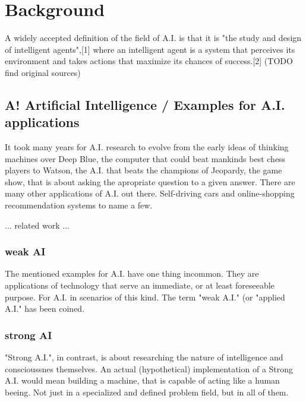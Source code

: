 \chapter{Background}

A widely accepted definition of the field of A.I. is that it is "the study and design of intelligent agents",[1] where an intelligent agent is a system that perceives its environment and takes actions that maximize its chances of success.[2] (TODO find original sources)

\section{A! Artificial Intelligence / Examples for A.I. applications}
It took many years for A.I. research to evolve from the early ideas of thinking machines over Deep Blue, the computer that could beat mankinds best chess players to Watson, the A.I. that beats the champions of Jeopardy, the game show, that is about asking the apropriate question to a given answer. There are many other applications of A.I. out there. Self-driving cars and online-shopping recommendation systems to name a few.

... related work ...

\subsection{weak AI}
The mentioned examples for A.I. have one thing incommon. They are applications of technology that serve an immediate, or at least foreseeable purpose. For A.I. in scenarios of this kind. The term "weak A.I." (or "applied A.I." has been coined.

\subsection{strong AI}
"Strong A.I.", in contrast, is about researching the nature of intelligence and conscioussnes themselves. An actual (hypothetical) implementation of a Strong A.I. would mean building a machine, that is capable of acting like a human beeing. Not just in a specialized and defined problem field, but in all of them.

